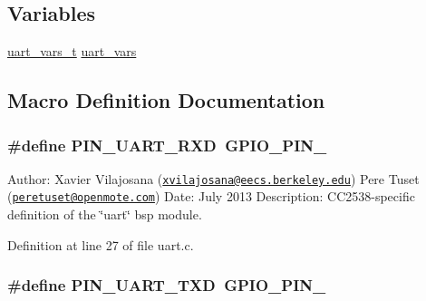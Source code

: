 \subsection*{Variables}
\begin{DoxyCompactItemize}
\item 
\hyperlink{structuart__vars__t}{uart\+\_\+vars\+\_\+t} \hyperlink{_open_mote-_c_c2538_2uart_8c_a7ad63ce38b958040884df8d8ca5da620}{uart\+\_\+vars}
\end{DoxyCompactItemize}


\subsection{Macro Definition Documentation}
\subsubsection[{\texorpdfstring{P\+I\+N\+\_\+\+U\+A\+R\+T\+\_\+\+R\+XD}{PIN_UART_RXD}}]{\setlength{\rightskip}{0pt plus 5cm}\#define P\+I\+N\+\_\+\+U\+A\+R\+T\+\_\+\+R\+XD~{\bf G\+P\+I\+O\+\_\+\+P\+I\+N\+\_}}\hypertarget{_open_mote-_c_c2538_2uart_8c_a6000ecd7fdabc2abce63287af4093774}{}\label{_open_mote-_c_c2538_2uart_8c_a6000ecd7fdabc2abce63287af4093774}
Author\+: Xavier Vilajosana (\href{mailto:xvilajosana@eecs.berkeley.edu}{\tt xvilajosana@eecs.\+berkeley.\+edu}) Pere Tuset (\href{mailto:peretuset@openmote.com}{\tt peretuset@openmote.\+com}) Date\+: July 2013 Description\+: C\+C2538-\/specific definition of the \char`\"{}uart\char`\"{} bsp module. 

Definition at line 27 of file uart.\+c.

\subsubsection[{\texorpdfstring{P\+I\+N\+\_\+\+U\+A\+R\+T\+\_\+\+T\+XD}{PIN_UART_TXD}}]{\setlength{\rightskip}{0pt plus 5cm}\#define P\+I\+N\+\_\+\+U\+A\+R\+T\+\_\+\+T\+XD~{\bf G\+P\+I\+O\+\_\+\+P\+I\+N\+\_}}\hypertarget{_open_mote-_c_c2538_2uart_8c_a63a0da2ae4672d786adcf2616b4ed189}{}\label{_open_mote-_c_c2538_2uart_8c_a63a0da2ae4672d786adcf2616b4ed189}


